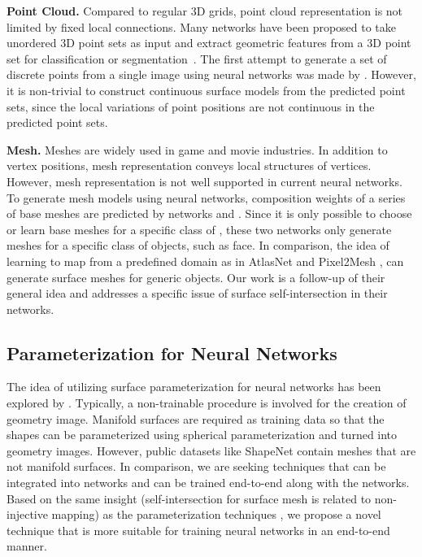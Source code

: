 \noindent\textbf{Point Cloud.}
Compared to regular 3D grids, point cloud representation is not limited by fixed local connections.
Many networks have been proposed to take unordered 3D point sets as input and extract geometric features from a 3D point set for classification or segmentation~\cite{pointnet,NIPS2017_7095,pointcnn}.
%
The first attempt to generate a set of discrete points from a single image using neural networks was made by \cite{PSGN}. However, it is non-trivial to construct continuous surface models from the predicted point sets, since the local variations of point positions are not continuous in the predicted point sets.

\noindent\textbf{Mesh.}
Meshes are widely used in game and movie industries.
In addition to vertex positions, mesh representation conveys local structures of vertices. 
However, mesh representation is not well supported in current neural networks.
% 
To generate mesh models using neural networks, composition weights of a series of base meshes are predicted by networks \cite{img2mesh} and \cite{endface}. %
Since it is only possible to choose or learn base meshes for a specific class of , these two networks only generate meshes for a specific class of objects, such as face.
%
In comparison, the idea of learning to map from a predefined domain as in AtlasNet \cite{atlasnet} and Pixel2Mesh \cite{pixel2mesh}, can generate surface meshes for generic objects. Our work is a follow-up of their general idea and addresses a specific issue of surface self-intersection in their networks.

\subsection{Parameterization for Neural Networks}
The idea of utilizing surface parameterization for neural networks has been explored by \cite{surfnet,geoimg}. 
Typically, a non-trainable procedure is involved for the creation of geometry image. 
Manifold surfaces are required as training data so that the shapes can be parameterized using spherical parameterization and turned into geometry images. However, public datasets like ShapeNet \cite{shapenetdata} contain meshes that are not manifold surfaces. 
In comparison, we are seeking techniques that can be integrated into networks and can be trained end-to-end along with the networks. Based on the same insight (self-intersection for surface mesh is related to non-injective mapping) as the parameterization techniques , we propose a novel technique that is more suitable for training neural networks in an end-to-end manner. 

